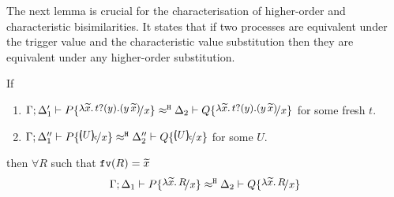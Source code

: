 %
%

The next lemma is crucial for the characterisation of
higher-order and characteristic bisimilarities.
It states that if two processes are equivalent under the
trigger value and the characteristic value substitution then
they are equivalent under any higher-order substitution.

\begin{lemma}
	\label{lem:proc_subst}
	If 
%
	\begin{enumerate}
		\item	$\horel{\Gamma}{\Delta_1'}{P \subst{\auxtr{t}}{x}}{\hwb}{\Delta_2}{Q \subst{\auxtr{t}}{x}}$
			for some fresh $t$.

		\item	$\horel{\Gamma}{\Delta_1''}{P \subst{\omapchar{U}}{x}}{\hwb}{\Delta_2''}{Q \subst{\omapchar{U}}{x}}$
				for some $U$.
	\end{enumerate}
%
	then $\forall R$ such that $\mathtt{fv}(R) = \widetilde{x}$
	\[
		\horel{\Gamma}{\Delta_1}{P \subst{\abs{\widetilde{x}}{R}}{x}}{\hwb}{\Delta_2}{Q \subst{\abs{\widetilde{x}}{R}}{x}}
	\]
\end{lemma}

